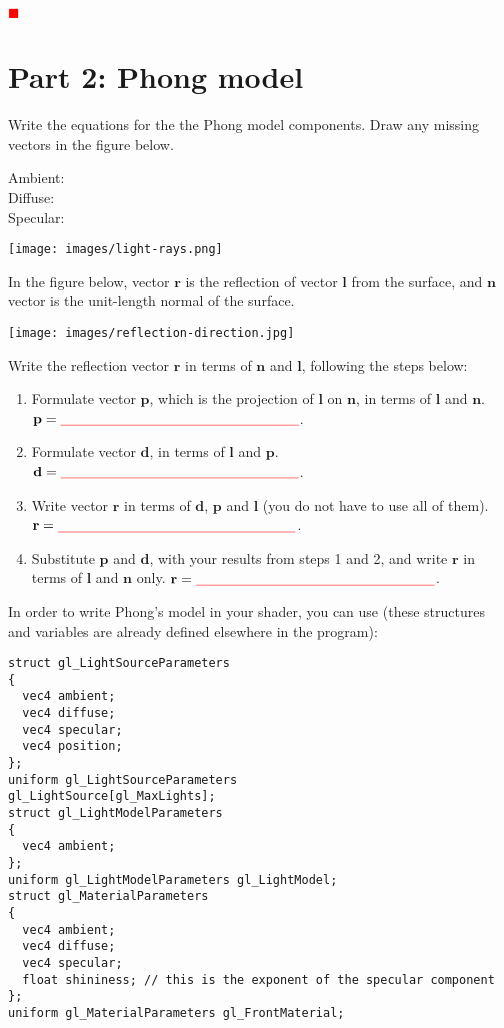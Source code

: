 \documentclass[12pt]{article}
\newenvironment{solution}{\par\textcolor{green!50!black}\bgroup}{\egroup\par}
\newcommand{\TODO}{\textcolor{red}{$\blacksquare$}}
\newcommand{\TODOL}[1]{\textcolor{red}{\underline{\hspace{#1 cm}}}}
\begin{document}
\begin{solution}
  \textbf{\textcolor{red}{\TODO}}
\end{solution}

\section*{Part 2: Phong model}

Write the equations for the the Phong model components. Draw any missing vectors
in the figure below.

Ambient: \TODOL6\\
Diffuse: \TODOL6\\
Specular: \TODOL6

\texttt{[image: images/light-rays.png]}

In the figure below, vector $\mathbf{r}$ is the reflection of vector $\mathbf{l}$ from the
surface, and $\mathbf{n}$ vector is the unit-length normal of the surface.

\texttt{[image: images/reflection-direction.jpg]}

Write the reflection vector $\mathbf{r}$ in terms of $\mathbf{n}$ and $\mathbf{l}$, following the steps
below:
\begin{enumerate}
\item Formulate vector $\mathbf{p}$, which is the projection of $\mathbf{l}$ on $\mathbf{n}$, in terms of
  $\mathbf{l}$ and $\mathbf{n}$. $\mathbf{p}= \TODOL6$.
\item Formulate vector $\mathbf{d}$, in terms of $\mathbf{l}$ and $\mathbf{p}$.  $\mathbf{d}= \TODOL6$.
\item Write vector $\mathbf{r}$ in terms of $\mathbf{d}$, $\mathbf{p}$ and $\mathbf{l}$ (you do not have to use all
  of them). $\mathbf{r} = \TODOL6$.
\item Substitute $\mathbf{p}$ and $\mathbf{d}$, with your results from steps 1 and 2, and write
  $\mathbf{r}$ in terms of $\mathbf{l}$ and $\mathbf{n}$ only.  $\mathbf{r}=\TODOL6$.
\end{enumerate}

In order to write Phong's model in your shader, you can use (these structures and variables are already defined elsewhere in the program):

\begin{lstlisting}
struct gl_LightSourceParameters
{
  vec4 ambient;
  vec4 diffuse;
  vec4 specular;
  vec4 position;
};
uniform gl_LightSourceParameters
gl_LightSource[gl_MaxLights];
struct gl_LightModelParameters
{
  vec4 ambient;
};
uniform gl_LightModelParameters gl_LightModel;
struct gl_MaterialParameters
{
  vec4 ambient;
  vec4 diffuse;
  vec4 specular;
  float shininess; // this is the exponent of the specular component
};
uniform gl_MaterialParameters gl_FrontMaterial;
\end{lstlisting}
\end{document}
